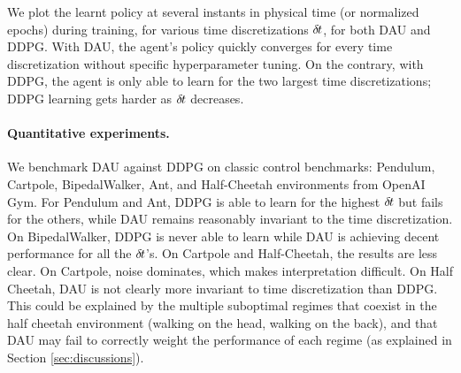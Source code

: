 We plot the learnt policy at several instants in physical time (or
normalized epochs) during training, for various time discretizations
${\delta\hspace{-.1em}t}$, for both DAU and DDPG. With DAU, the agent's policy quickly
converges for every time discretization without specific hyperparameter
tuning. On the contrary, with DDPG, the agent is only able to learn for
the two largest time discretizations; DDPG learning gets harder as ${\delta\hspace{-.1em}t}$ decreases.

\paragraph{Quantitative experiments.}
We benchmark DAU against DDPG on classic control benchmarks: Pendulum,
Cartpole, BipedalWalker, Ant, and Half-Cheetah environments from OpenAI
Gym. For Pendulum and Ant, DDPG is able to learn for the highest
${\delta\hspace{-.1em}t}$ but fails for the others, while DAU remains reasonably
invariant to the time discretization. On BipedalWalker, DDPG is never
able to learn while DAU is achieving decent performance for all the
${\delta\hspace{-.1em}t}$'s. On Cartpole and Half-Cheetah, the results are less clear. On
Cartpole, noise dominates, which makes interpretation difficult. On Half
Cheetah, DAU is not clearly more invariant to time discretization than
DDPG. This could be explained by the multiple suboptimal regimes that
coexist in the half cheetah environment (walking on the head, walking on
the back), and that DAU may fail to correctly weight the performance of
each regime (as explained in Section \ref{sec:discussions}).


% 
